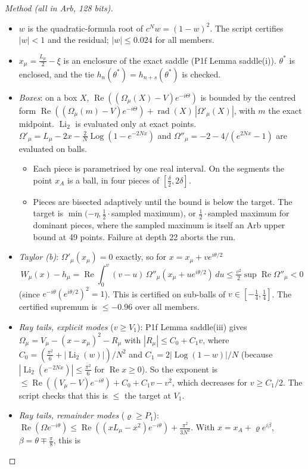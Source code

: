 \documentclass[11pt]{article}
\theoremstyle{remark}\newtheorem{remark}[theorem]{Remark}
\newcommand{\Li}{\operatorname{Li}_2}
\begin{document}
\begin{proof}[Method (all in Arb, 128 bits)]
\begin{itemize}
\item $w$ is the quadratic-formula root of $c^Nw=(1-w)^2$. The script certifies $|w|<1$ and the residual; $|w|\le0.024$ for all members.
\item $x_\mu=\frac{L_\mu}2-\xi$ is an enclosure of the exact saddle (P1f Lemma saddle(i)). $\theta^*$ is enclosed, and the tie $h_n(\theta^*)=h_{n+s}(\theta^*)$ is checked.
\item \emph{Boxes}: on a box $X$, $\operatorname{Re}((\Omega_\mu(X)-V)e^{-i\Theta})$ is bounded by the centred form $\operatorname{Re}((\Omega_\mu(m)-V)e^{-i\Theta})+\operatorname{rad}(X)\,|\Omega'_\mu(X)|$, with $m$ the exact midpoint. $\Li$ is evaluated only at exact points. $\Omega'_\mu=L_\mu-2x-\frac2N\operatorname{Log}(1-e^{-2Nx})$ and $\Omega''_\mu=-2-4/(e^{2Nx}-1)$ are evaluated on balls.
 \begin{itemize}
 \item Each piece is parametrised by one real interval. On the segments the point $x_A$ is a ball, in four pieces of $[\frac\delta2,2\delta]$.
 \item Pieces are bisected adaptively until the bound is below the target. The target is $\min(-\eta,\frac12\cdot{}$sampled maximum$)$, or $\frac12\cdot{}$sampled maximum for dominant pieces, where the sampled maximum is itself an Arb upper bound at 49 points. Failure at depth 22 aborts the run.
 \end{itemize}
\item \emph{Taylor (b)}: $\Omega'_\mu(x_\mu)=0$ exactly, so for $x=x_\mu+ve^{i\theta/2}$
\[W_\mu(x)-h_\mu=\operatorname{Re}\int_0^v(v-u)\,\Omega''_\mu(x_\mu+ue^{i\theta/2})\,du\le\tfrac{v^2}2\sup\operatorname{Re}\Omega''_\mu<0\]
(since $e^{-i\theta}(e^{i\theta/2})^2=1$). This is certified on sub-balls of $v\in[-\frac14,\frac14]$. The certified supremum is $\le-0.96$ over all members.
\item \emph{Ray tails, explicit modes} ($v\ge V_1$): P1f Lemma saddle(iii) gives $\Omega_\mu=V_\mu-(x-x_\mu)^2-R_\mu$ with $|R_\mu|\le C_0+C_1v$, where $C_0=(\frac{\pi^2}6+|\Li(w)|)/N^2$ and $C_1=2|\operatorname{Log}(1-w)|/N$ (because $|\Li(e^{-2Nx})|\le\frac{\pi^2}6$ for $\operatorname{Re}x\ge0$). So the exponent is $\le\operatorname{Re}((V_\mu-V)e^{-i\theta})+C_0+C_1v-v^2$, which decreases for $v\ge C_1/2$. The script checks that this is $\le$ the target at $V_1$.
\item \emph{Ray tails, remainder modes} ($\varrho\ge P_1$): $\operatorname{Re}(\Omega e^{-i\theta})\le\operatorname{Re}((xL_\mu-x^2)e^{-i\theta})+\frac{\pi^2}{3N^2}$. With $x=x_A+\varrho e^{i\beta}$, $\beta=\theta\mp\frac\pi8$, this is

\end{itemize}
\end{proof}
\end{document}
